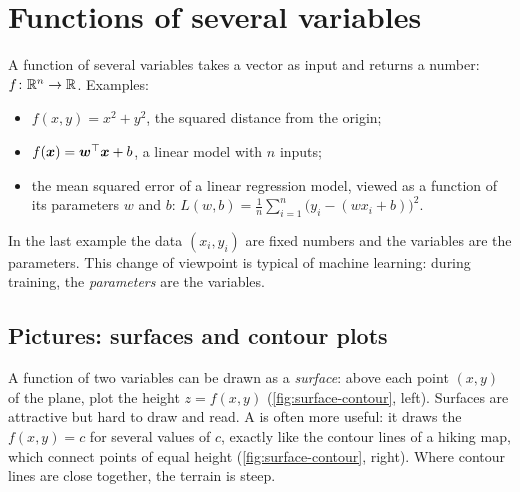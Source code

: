 \section{Functions of several variables}\label{sec:multivariable-functions}

A function of several variables takes a vector as input and returns a number:
$f\colon \mathbb{R}^n \to \mathbb{R}$. Examples:
\begin{itemize}
  \item $f(x, y) = x^2 + y^2$, the squared distance from the origin;
  \item $f(\bm{x}) = \bm{w}^\top\bm{x} + b$, a linear model with $n$ inputs;
  \item the mean squared error of a linear regression model, viewed as a
    function of its parameters $w$ and $b$:
    $L(w, b) = \frac1n\sum_{i=1}^n\bigl(y_i - (wx_i + b)\bigr)^2$.
\end{itemize}
In the last example the data $(x_i, y_i)$ are fixed numbers and the variables
are the parameters. This change of viewpoint is typical of machine learning:
during training, the \emph{parameters} are the variables.

\subsection{Pictures: surfaces and contour plots}

A function of two variables can be drawn as a \emph{surface}: above each point
$(x, y)$ of the plane, plot the height $z = f(x, y)$
(\cref{fig:surface-contour}, left). Surfaces are attractive but hard to draw
and read. A  is often more useful: it draws the
 $f(x, y) = c$ for several values of $c$,
exactly like the contour lines of a hiking map, which connect points of equal
height (\cref{fig:surface-contour}, right). Where contour lines are close
together, the terrain is steep.

